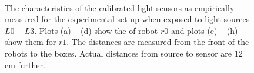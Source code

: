 \begin{figure}
\centering
{}
\\
\caption{The characteristics of the calibrated light sensors as empirically measured for the experimental set-up when exposed to light sources $L0 - L3$. Plots (a) -- (d) show the of robot $r0$ and plots (e) -- (h) show them for $r1$. The distances are measured from the front of the robots to the boxes. Actual distances from source to sensor are 12 cm further.}
\label{f:robots:calibration}
\end{figure}



